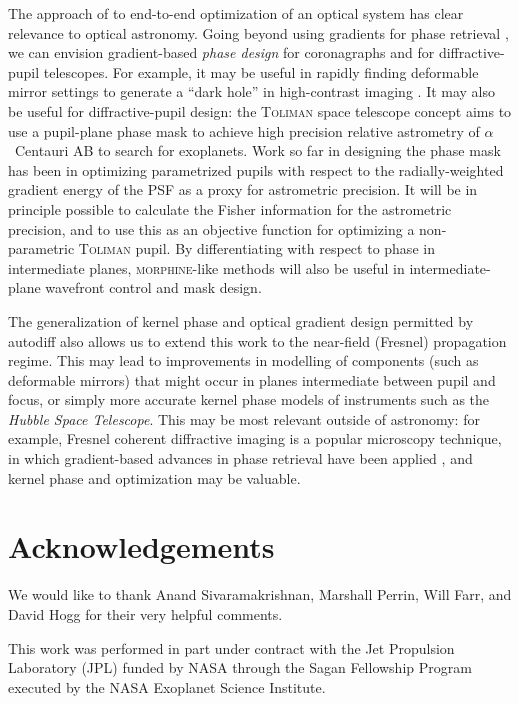 \documentclass[modern]{aastex63}
\begin{document}
The approach of \citet{sitzmann2018} to end-to-end optimization of an optical system has clear relevance to optical astronomy. Going beyond using gradients for phase retrieval \citep{jurling14}, we can envision gradient-based \textit{phase design} for coronagraphs and for diffractive-pupil telescopes. For example, it may be useful in rapidly finding deformable mirror settings to generate a ``dark hole'' in high-contrast imaging \citep{malbet95}. It may also be useful for diffractive-pupil design: the \textsc{Toliman} space telescope concept \citep{tuthill18,bendek18} aims to use a pupil-plane phase mask to achieve high precision relative astrometry of $\alpha$~Centauri AB to search for exoplanets. Work so far in designing the phase mask has been in optimizing parametrized pupils with respect to the radially-weighted gradient energy of the PSF as a proxy for astrometric precision. It will be in principle possible to calculate the Fisher information for the astrometric precision, and to use this as an objective function for optimizing a non-parametric \textsc{Toliman} pupil. By differentiating with respect to phase in intermediate planes, \textsc{morphine}-like methods will also be useful in intermediate-plane wavefront control and mask design.

The generalization of kernel phase and optical gradient design permitted by autodiff also allows us to extend this work to the near-field (Fresnel) propagation regime. This may lead to improvements in modelling of components (such as deformable mirrors) that might occur in planes intermediate between pupil and focus, or simply more accurate kernel phase models of instruments such as the \textit{Hubble Space Telescope}. This may be most relevant outside of astronomy: for example, Fresnel coherent diffractive imaging \citep{williams2006} is a popular microscopy technique, in which gradient-based advances in phase retrieval have been applied \citep{Dueaay3700}, and kernel phase and optimization may be valuable.

\section*{Acknowledgements} %

We would like to thank Anand Sivaramakrishnan, Marshall Perrin, Will Farr, and David Hogg for their very helpful comments.

This work was performed in part under contract with the Jet Propulsion Laboratory (JPL) funded by NASA through the Sagan Fellowship Program executed by the NASA Exoplanet Science Institute. 
\end{document}
